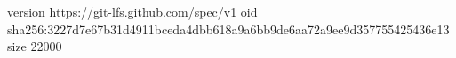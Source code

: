 version https://git-lfs.github.com/spec/v1
oid sha256:3227d7e67b31d4911bceda4dbb618a9a6bb9de6aa72a9ee9d357755425436e13
size 22000
